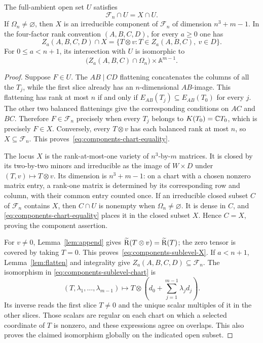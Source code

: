 \begin{proposition}\label{prop:components-chart}
The full-ambient open set $U$ satisfies
\begin{equation}\label{eq:components-chart-equality}
 \mathcal F_n\cap U=X\cap U.
\end{equation}
If $\Omega_n\ne\varnothing$, then $X$ is an irreducible component of
$\mathcal F_n$ of dimension $n^3+m-1$. In the four-factor rank convention
$(A,B,C,D)$, for every $a\geq0$ one has
\begin{equation}\label{eq:components-sublevel-X}
 Z_a(A,B,C,D)\cap X
   =\{T\otimes v:T\in Z_a(A,B,C),\ v\in D\}.
\end{equation}
For $0\leq a<n+1$, its intersection with $U$ is isomorphic to
\begin{equation}\label{eq:components-sublevel-chart}
 \bigl(Z_a(A,B,C)\cap\Omega_n\bigr)\times\mathbb A^{m-1}.
\end{equation}
\end{proposition}

\begin{proof}
Suppose $F\in U$. The $AB\mid CD$ flattening concatenates the columns
of all the $T_j$, while the first slice already has an $n$-dimensional
$AB$-image. This flattening has rank at most $n$ if and only if
$E_{AB}(T_j)\subseteq E_{AB}(T_0)$ for every $j$. The other two balanced
flattenings give the corresponding conditions on $AC$ and $BC$.
Therefore $F\in\mathcal F_n$ precisely when every $T_j$ belongs to
$K(T_0)=\mathbb C T_0$, which is precisely $F\in X$. Conversely, every
$T\otimes v$ has each balanced rank at most $n$, so $X\subseteq\mathcal F_n$.
This proves~\eqref{eq:components-chart-equality}.

The locus $X$ is the rank-at-most-one variety of $n^3$-by-$m$ matrices.
It is closed by its two-by-two minors and irreducible as the image of
$W\times D$ under $(T,v)\mapsto T\otimes v$. Its dimension is
$n^3+m-1$: on a chart with a chosen nonzero matrix entry, a rank-one
matrix is determined by its corresponding row and column, with their
common entry counted once. If an irreducible closed subset $C$ of
$\mathcal F_n$ contains $X$, then $C\cap U$ is nonempty when
$\Omega_n\ne\varnothing$. It is dense in $C$, and
\eqref{eq:components-chart-equality} places it in the closed subset
$X$. Hence $C=X$, proving the component assertion.

For $v\ne0$, Lemma~\ref{lem:append} gives
$\widetilde{\mathrm R}(T\otimes v)=\widetilde{\mathrm R}(T)$; the zero tensor is covered by taking $T=0$.
This proves~\eqref{eq:components-sublevel-X}. If $a<n+1$,
Lemma~\ref{lem:flatten} and integrality give
$Z_a(A,B,C,D)\subseteq\mathcal F_n$. The isomorphism in
\eqref{eq:components-sublevel-chart} is
\[
 (T,\lambda_1,\ldots,\lambda_{m-1})
   \longmapsto T\otimes\left(d_0+\sum_{j=1}^{m-1}\lambda_jd_j\right).
\]
Its inverse reads the first slice $T\ne0$ and the unique scalar multiples
of it in the other slices. Those scalars are regular on each chart on
which a selected coordinate of $T$ is nonzero, and these expressions
agree on overlaps. This also proves the claimed isomorphism globally
on the indicated open subset.
\end{proof}

